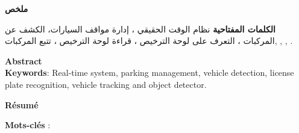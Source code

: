 \begin{RLtext}
\par
\textbf{\Large{ملخص}}\\
\small



\textbf{الكلمات المفتاحية \LR{:}} 
 نظام الوقت الحقيقي ، إدارة مواقف السيارات، الكشف عن المركبات ، التعرف على لوحة الترخيص ، قراءة لوحة الترخيص ،  تتبع المركبات,  ,  ,  .
\end{RLtext}



\vspace{0.5cm}

\par
\textbf{\Large{Abstract}}\\





\textbf{Keywords}: Real-time system, parking management, vehicle detection, license plate recognition, vehicle tracking and object detector.

\vspace{0.5cm}

\par
\textbf{\Large{Résumé}}\\




\par \textbf{Mots-clés} : 


